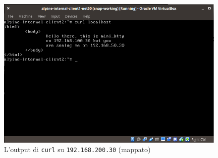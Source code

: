 \begin{figure}
  \includegraphics[scale=0.4]{img/alpine-internal-client1-net50}
  \caption[Output di curl su target 3 in \texttt{net200}]
  {L'output di \texttt{curl} su \texttt{192.168.200.30} (mappato)}
  \label{fig:alpine-internal-client-net200}
\end{figure}

